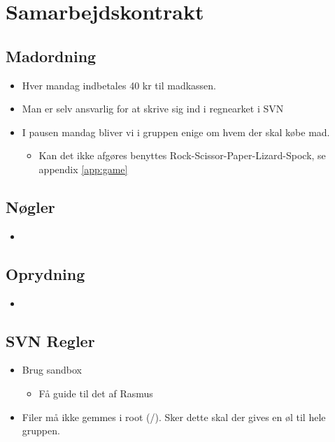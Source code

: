 \documentclass{article}
\begin{document}
\section{Samarbejdskontrakt}
\subsection{Madordning}
\begin{itemize}
	\item Hver mandag indbetales 40 kr til madkassen.
	\item Man er selv ansvarlig for at skrive sig ind i regnearket i SVN
	\item I pausen mandag bliver vi i gruppen enige om hvem der skal købe mad.
	
\begin{itemize}
	\item Kan det ikke afgøres benyttes Rock-Scissor-Paper-Lizard-Spock, se appendix \ref{app:game}
\end{itemize}
\end{itemize}

\subsection{Nøgler}
\begin{itemize}
	\item 
\end{itemize}

\subsection{Oprydning}
\begin{itemize}
	\item 
\end{itemize}

\subsection{SVN Regler}
\begin{itemize}
	\item Brug sandbox
	\begin{itemize}
		\item Få guide til det af Rasmus
	\end{itemize}
	\item Filer m\aa{} ikke gemmes i root (/). Sker dette skal der gives en \o{}l til hele gruppen.  
\end{itemize}
\end{document}
